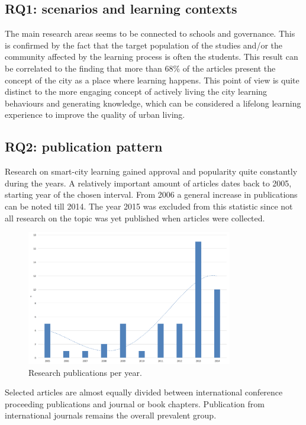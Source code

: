 \subsection*{RQ1: scenarios and learning contexts}

The main research areas seems to be connected to schools and governance.
This is confirmed by the fact that the target population of the studies and/or the community affected by the learning process is often the students.
This result can be correlated to the finding that more than 68\% of the articles present the concept of the city as a place where learning happens. This point of view is quite distinct to the more engaging concept of actively living the city learning behaviours and generating knowledge, which can be considered a lifelong learning experience to improve the quality of urban living.


\subsection*{RQ2: publication pattern}

Research on smart-city learning gained approval and popularity quite constantly during the years. A relatively important amount of articles dates back to 2005, starting year of the chosen interval. From 2006 a general increase in publications can be noted till 2014. The year 2015 was excluded from this statistic since not all research on the topic was yet published when articles were collected.

\begin{figure}[tbh]
\centering
\includegraphics[width=9cm]{img/years}
\caption{Research publications per year.}
\label{fig:years}
\end{figure}

Selected articles are almost equally divided between international conference proceeding publications and journal or book chapters.
Publication from international journals remains the overall prevalent group.

